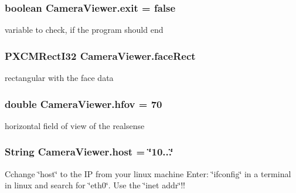 \subsubsection[{\texorpdfstring{exit}{exit}}]{\setlength{\rightskip}{0pt plus 5cm}boolean Camera\+Viewer.\+exit = false\hspace{0.3cm}{\ttfamily [static]}}\hypertarget{class_camera_viewer_a1de16e85ab6c251bb6af54bdecf99f03}{}\label{class_camera_viewer_a1de16e85ab6c251bb6af54bdecf99f03}
variable to check, if the program should end 
\subsubsection[{\texorpdfstring{face\+Rect}{faceRect}}]{\setlength{\rightskip}{0pt plus 5cm}P\+X\+C\+M\+Rect\+I32 Camera\+Viewer.\+face\+Rect\hspace{0.3cm}{\ttfamily [static]}}\hypertarget{class_camera_viewer_a9fd124ff0771b5037aebfac55a49cc74}{}\label{class_camera_viewer_a9fd124ff0771b5037aebfac55a49cc74}
rectangular with the face data 
\subsubsection[{\texorpdfstring{hfov}{hfov}}]{\setlength{\rightskip}{0pt plus 5cm}double Camera\+Viewer.\+hfov = 70\hspace{0.3cm}{\ttfamily [static]}}\hypertarget{class_camera_viewer_acc21e91b5db8c8166f18507a357210b3}{}\label{class_camera_viewer_acc21e91b5db8c8166f18507a357210b3}
horizontal field of view of the realsense 
\subsubsection[{\texorpdfstring{host}{host}}]{\setlength{\rightskip}{0pt plus 5cm}String Camera\+Viewer.\+host = \char`\"{}10...\char`\"{}\hspace{0.3cm}{\ttfamily [static]}}\hypertarget{class_camera_viewer_ae3aa04f2442f86d016ac36ec1826f602}{}\label{class_camera_viewer_ae3aa04f2442f86d016ac36ec1826f602}
Cchange \char`\"{}host\char`\"{} to the IP from your linux machine Enter\+: \char`\"{}ifconfig\char`\"{} in a terminal in linux and search for \char`\"{}eth0\char`\"{}. Use the \char`\"{}inet addr\char`\"{}!! 
